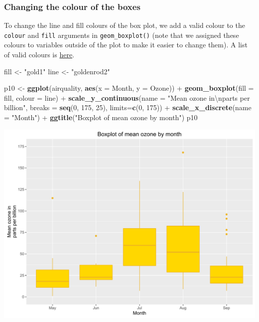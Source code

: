 \documentclass[]{article}
\newenvironment{Shaded}{\begin{snugshade}}{\end{snugshade}}
\newcommand{\KeywordTok}[1]{\textcolor[rgb]{0.13,0.29,0.53}{\textbf{{#1}}}}
\newcommand{\DataTypeTok}[1]{\textcolor[rgb]{0.13,0.29,0.53}{{#1}}}
\newcommand{\DecValTok}[1]{\textcolor[rgb]{0.00,0.00,0.81}{{#1}}}
\newcommand{\CharTok}[1]{\textcolor[rgb]{0.31,0.60,0.02}{{#1}}}
\newcommand{\StringTok}[1]{\textcolor[rgb]{0.31,0.60,0.02}{{#1}}}
\newcommand{\NormalTok}[1]{{#1}}
\begin{document}
\subsubsection{Changing the colour of the
boxes}\label{changing-the-colour-of-the-boxes}

To change the line and fill colours of the box plot, we add a valid
colour to the \texttt{colour} and \texttt{fill} arguments in
\texttt{geom\_boxplot()} (note that we assigned these colours to
variables outside of the plot to make it easier to change them). A list
of valid colours is
\href{http://www.stat.columbia.edu/~tzheng/files/Rcolor.pdf}{here}.

\begin{Shaded}
\begin{Highlighting}[]
\NormalTok{fill <-}\StringTok{ "gold1"}
\NormalTok{line <-}\StringTok{ "goldenrod2"}

\NormalTok{p10 <-}\StringTok{ }\KeywordTok{ggplot}\NormalTok{(airquality, }\KeywordTok{aes}\NormalTok{(}\DataTypeTok{x =} \NormalTok{Month, }\DataTypeTok{y =} \NormalTok{Ozone)) +}\StringTok{ }
\StringTok{        }\KeywordTok{geom_boxplot}\NormalTok{(}\DataTypeTok{fill =} \NormalTok{fill, }\DataTypeTok{colour =} \NormalTok{line) +}
\StringTok{        }\KeywordTok{scale_y_continuous}\NormalTok{(}\DataTypeTok{name =} \StringTok{"Mean ozone in}\CharTok{\textbackslash{}n}\StringTok{parts per billion"}\NormalTok{,}
                           \DataTypeTok{breaks =} \KeywordTok{seq}\NormalTok{(}\DecValTok{0}\NormalTok{, }\DecValTok{175}\NormalTok{, }\DecValTok{25}\NormalTok{),}
                           \DataTypeTok{limits=}\KeywordTok{c}\NormalTok{(}\DecValTok{0}\NormalTok{, }\DecValTok{175}\NormalTok{)) +}
\StringTok{        }\KeywordTok{scale_x_discrete}\NormalTok{(}\DataTypeTok{name =} \StringTok{"Month"}\NormalTok{) +}
\StringTok{        }\KeywordTok{ggtitle}\NormalTok{(}\StringTok{"Boxplot of mean ozone by month"}\NormalTok{)}
\NormalTok{p10}
\end{Highlighting}
\end{Shaded}

\begin{center}\includegraphics{0_all_posts_pdf/box_6-1} \end{center}
\end{document}
